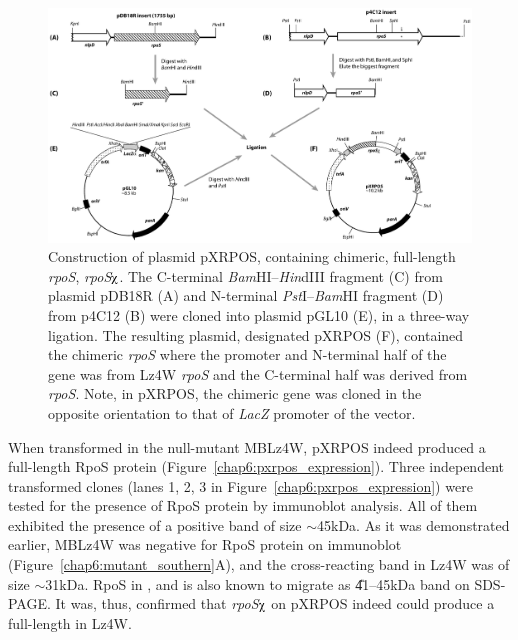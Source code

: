 \begin{figure}
\centering
\includegraphics{figures/chap6_pxrpos}
\caption[Construction of pXRPOS]{Construction of plasmid pXRPOS,
containing chimeric, full-length \emph{rpoS}, \emph{rpoS}$\chiup$.
The C-terminal \emph{Bam}HI--\emph{Hin}dIII fragment (C) from
plasmid pDB18R (A) and N-terminal \emph{Pst}I--\emph{Bam}HI
fragment (D) from p4C12 (B) were cloned into plasmid pGL10 (E), in
a three-way ligation. The resulting plasmid, designated pXRPOS
(F), contained the chimeric \emph{rpoS} where the promoter and
N-terminal half of the gene was from Lz4W \emph{rpoS} and the
C-terminal half was derived from  \emph{rpoS}. Note, in
pXRPOS, the chimeric gene was cloned in the opposite orientation
to that of \emph{LacZ} promoter of the vector.}
\label{chap6:pxrpos}
\end{figure}

When transformed in the null-mutant MBLz4W, pXRPOS indeed produced
a full-length RpoS protein (Figure~\ref{chap6:pxrpos_expression}).
Three independent transformed clones (lanes 1, 2, 3 in
Figure~\ref{chap6:pxrpos_expression}) were tested for the presence
of RpoS protein by immunoblot analysis. All of them exhibited the
presence of a positive band of size \U{$\sim$45}{kDa}. As it was
demonstrated earlier, MBLz4W was negative for RpoS protein on
immunoblot (Figure~\ref{chap6:mutant_southern}A), and the
cross-reacting band in Lz4W was of size \U{$\sim$31}{kDa}. RpoS in
, and  is also known to migrate as
\U{41--45}{kDa} band on SDS-PAGE. It was, thus, confirmed that
\emph{rpoS}$\chiup$ on pXRPOS indeed could produce a full-length
\sigs{} in Lz4W.

